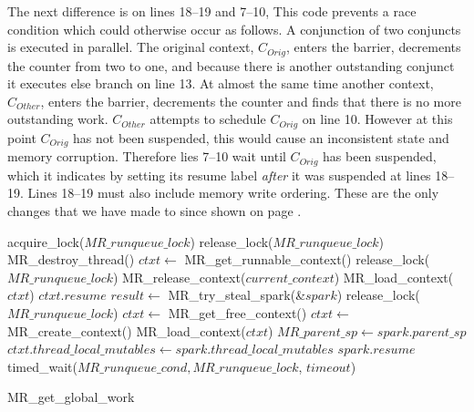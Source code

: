 The next difference is on lines 18--19 and 7--10,
This code prevents a race condition which could otherwise occur as follows.
A conjunction of two conjuncts is executed in parallel.
The original context, $C_{Orig}$,
enters the barrier, decrements the counter from two to one,
and because there is another outstanding conjunct it executes else
branch on line 13.
At almost the same time another context, $C_{Other}$,
enters the barrier, decrements the counter and finds that there is no more
outstanding work.
$C_{Other}$ attempts to schedule $C_{Orig}$ on line 10.
However at this point $C_{Orig}$ has not been suspended, this would cause an
inconsistent state and memory corruption.
Therefore lies 7--10 wait until $C_{Orig}$ has been suspended, which it
indicates by setting its resume label \emph{after} it was suspended at lines
18--19.
Lines 18--19 must also include memory write ordering.
These are the only changes that we have made to \joinandcontinue since shown
on page \pageref{alg:join_and_continue_peterw}.

\begin{algorithm}
\begin{algorithmic}[1]
  \State acquire\_lock($MR\_runqueue\_lock$)
  \Loop
      \State release\_lock($MR\_runqueue\_lock$)
      \State MR\_destroy\_thread()
    \EndIf
    \State $ctxt \gets$ MR\_get\_runnable\_context()
      \State release\_lock($MR\_runqueue\_lock$)
        \State MR\_release\_context($current\_context$)
      \EndIf
      \State MR\_load\_context($ctxt$)
      \Goto $ctxt.resume$
    \EndIf
      \State $result \gets$ MR\_try\_steal\_spark(\&$spark$)
        \State release\_lock($MR\_runqueue\_lock$)
          \State $ctxt \gets$ MR\_get\_free\_context()
            \State $ctxt \gets$ MR\_create\_context()
          \EndIf
          \State MR\_load\_context($ctxt$)
        \EndIf
        \State $MR\_parent\_sp \gets spark.parent\_sp$
        \State $ctxt.thread\_local\_mutables \gets
          spark.thread\_local\_mutables$
        \Goto $spark.resume$
      \EndIf
    \EndIf
    \State timed\_wait($MR\_runqueue\_cond, MR\_runqueue\_lock$, $timeout$)
  \EndLoop
\EndProcedure
\end{algorithmic}
\caption{MR\_get\_global\_work}
\label{alg:MR_get_global_work}
\end{algorithm}

